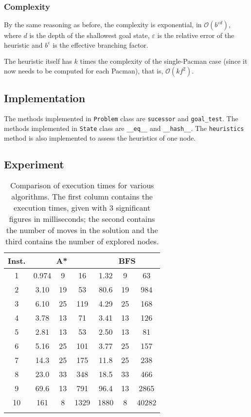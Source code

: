 \documentclass[journal]{IEEEtran}
\newcommand{\py}[1]{\texttt{#1}}
\begin{document}
\subsubsection{Complexity}
By the same reasoning as before, the complexity is exponential, in \(\mathcal{O}(b^{\varepsilon d})\), where \(d\) is the depth of the shallowest goal state, \(\varepsilon\) is the relative error of the heuristic and \(b^\varepsilon\) is the effective branching factor.

The heuristic itself has \(k\) times the complexity of the single-Pacman case (since it now needs to be computed for each Pacman), that is, \(\mathcal{O}(kf^2)\).

\subsection{Implementation}
The methods implemented in \py{Problem} class are \py{sucessor} and \py{goal_test}. The methods implemented in \py{State} class are \py{__eq__} and \py{__hash__}. The \py{heuristics} method is also implemented to assess the heuristics of one node.

\subsection{Experiment}
\begin{table}[!hbtp]
	\centering
	\begin{tabular}{c@{\hspace{0.7cm}}ccc|ccc} 
		\toprule
		Inst. & \multicolumn{3}{c}{A*} & \multicolumn{3}{c}{BFS} \\
		\midrule
		1 & 0.974 & 9 & 16  & 1.32 & 9 & 63 \\
		2 & 3.10 & 19 & 53 & 80.6 & 19 & 984 \\
		3 & 6.10 & 25 & 119 & 4.29 & 25 & 168 \\
		4 & 3.78 & 13 & 71 & 3.41 & 13 & 126 \\
		5 & 2.81 & 13 & 53 & 2.50 & 13 & 81 \\
		6 & 5.16 & 25 & 101 & 3.77 & 25 & 157 \\
		7 & 14.3 & 25 & 175 & 11.8 & 25 & 238 \\
		8 & 23.0 & 33 & 348 & 18.5 & 33 & 466 \\
		9 & 69.6 & 13 & 791  & 96.4 & 13 & 2865 \\
		10 & 161 & 8 & 1329 & 1880 & 8 & 40282 \\
		\bottomrule \\
	\end{tabular}
	\caption{Comparison of execution times for various algorithms.
		The first column contains the execution times, given with 3 significant figures in milliseconds; the second contains the number of moves in the solution and the third contains the number of explored nodes.}
	\label{time1}
\end{table}
\end{document}
